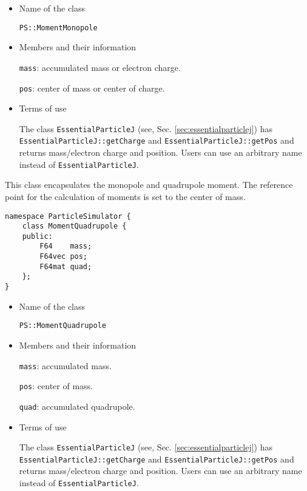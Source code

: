 \begin{itemize}

\item Name of the class

  \texttt{PS::MomentMonopole}

\item Members and their information

  \texttt{mass}: accumulated mass or electron charge.

  \texttt{pos}: center of mass or center of charge.

\item Terms of use

  The class \texttt{EssentialParticleJ} (see, Sec. \ref{sec:essentialparticlej}) has \texttt{EssentialParticleJ::getCharge} and \texttt{EssentialParticleJ::getPos}
  and returns mass/electron charge and position.
  Users can use an arbitrary name instead of \texttt{EssentialParticleJ}.

\end{itemize}

\label{sec:MomentQuadrupole}

This class encapsulates the monopole and quadrupole moment.
The reference point for the calculation of moments is set to the center of mass.

\begin{screen}
\begin{verbatim}
namespace ParticleSimulator {
    class MomentQuadrupole {
    public:
        F64    mass;    
        F64vec pos;
        F64mat quad;
    };
}
\end{verbatim}
\end{screen}

\begin{itemize}

\item Name of the class

  \texttt{PS::MomentQuadrupole}

\item Members and their information

  \texttt{mass}: accumulated mass.

  \texttt{pos}: center of mass.

  \texttt{quad}: accumulated quadrupole.

\item Terms of use

  The class \texttt{EssentialParticleJ} (see, Sec. \ref{sec:essentialparticlej}) has \texttt{EssentialParticleJ::getCharge} and \texttt{EssentialParticleJ::getPos}
  and returns mass/electron charge and position.
  Users can use an arbitrary name instead of \texttt{EssentialParticleJ}.

\end{itemize}

